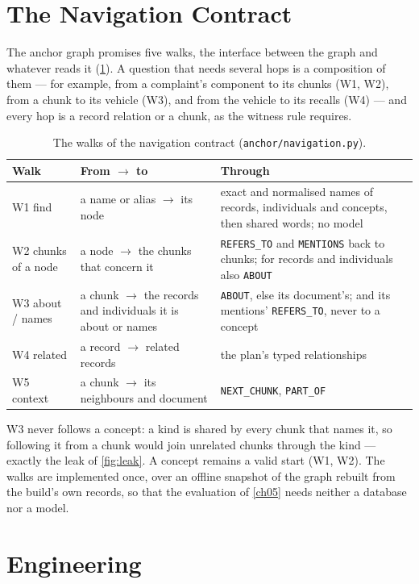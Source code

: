 \section{The Navigation Contract}\label{sec:ch04-navigation}

The anchor graph promises five walks, the interface between the graph and whatever reads it
(\cref{tab:walks}). A question that needs several hops is a composition of them --- for example, from a complaint's
component to its chunks (W1, W2), from a chunk to its vehicle (W3), and from the vehicle to its recalls (W4) ---
and every hop is a record relation or a chunk, as the witness rule requires.

\begin{table}[htbp]
\centering
\caption{The walks of the navigation contract (\texttt{anchor/navigation.py}).}
\label{tab:walks}
\small
\begin{tabularx}{\linewidth}{@{}llX@{}}
\toprule
Walk & From $\rightarrow$ to & Through \\
\midrule
W1 find & a name or alias $\rightarrow$ its node & exact and normalised names of records, individuals and concepts, then shared words; no model \\
W2 chunks of a node & a node $\rightarrow$ the chunks that concern it & \texttt{REFERS\_TO} and \texttt{MENTIONS} back to chunks; for records and individuals also \texttt{ABOUT} \\
W3 about / names & a chunk $\rightarrow$ the records and individuals it is about or names & \texttt{ABOUT}, else its document's; and its mentions' \texttt{REFERS\_TO}, never to a concept \\
W4 related & a record $\rightarrow$ related records & the plan's typed relationships \\
W5 context & a chunk $\rightarrow$ its neighbours and document & \texttt{NEXT\_CHUNK}, \texttt{PART\_OF} \\
\bottomrule
\end{tabularx}
\end{table}

W3 never follows a concept: a kind is shared by every chunk that names it, so following it from a chunk would join
unrelated chunks through the kind --- exactly the leak of \cref{fig:leak}. A concept remains a valid start (W1, W2).
The walks are implemented once, over an offline snapshot of the graph rebuilt from the build's own records, so
that the evaluation of \cref{ch05} needs neither a database nor a model.

\section{Engineering}\label{sec:ch04-engineering}


